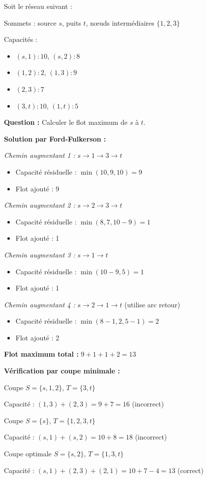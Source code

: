 \documentclass[12pt,a4paper]{article}
\begin{document}
\begin{exemple}
Soit le réseau suivant :

Sommets : source $s$, puits $t$, nœuds intermédiaires $\{1, 2, 3\}$

Capacités :
\begin{itemize}
    \item $(s,1): 10$, $(s,2): 8$
    \item $(1,2): 2$, $(1,3): 9$
    \item $(2,3): 7$
    \item $(3,t): 10$, $(1,t): 5$
\end{itemize}

\textbf{Question :} Calculer le flot maximum de $s$ à $t$.

\textbf{Solution par Ford-Fulkerson :}

\textit{Chemin augmentant 1 :} $s \to 1 \to 3 \to t$
\begin{itemize}
    \item Capacité résiduelle : $\min(10, 9, 10) = 9$
    \item Flot ajouté : 9
\end{itemize}

\textit{Chemin augmentant 2 :} $s \to 2 \to 3 \to t$
\begin{itemize}
    \item Capacité résiduelle : $\min(8, 7, 10-9) = 1$
    \item Flot ajouté : 1
\end{itemize}

\textit{Chemin augmentant 3 :} $s \to 1 \to t$
\begin{itemize}
    \item Capacité résiduelle : $\min(10-9, 5) = 1$
    \item Flot ajouté : 1
\end{itemize}

\textit{Chemin augmentant 4 :} $s \to 2 \to 1 \to t$ (utilise arc retour)
\begin{itemize}
    \item Capacité résiduelle : $\min(8-1, 2, 5-1) = 2$
    \item Flot ajouté : 2
\end{itemize}

\textbf{Flot maximum total :} $9 + 1 + 1 + 2 = 13$

\textbf{Vérification par coupe minimale :}

Coupe $S = \{s, 1, 2\}$, $T = \{3, t\}$

Capacité : $(1,3) + (2,3) = 9 + 7 = 16$ (incorrect)

Coupe $S = \{s\}$, $T = \{1, 2, 3, t\}$

Capacité : $(s,1) + (s,2) = 10 + 8 = 18$ (incorrect)

Coupe optimale $S = \{s, 2\}$, $T = \{1, 3, t\}$

Capacité : $(s,1) + (2,3) + (2,1) = 10 + 7 - 4 = 13$ (correct)
\end{exemple}
\end{document}
